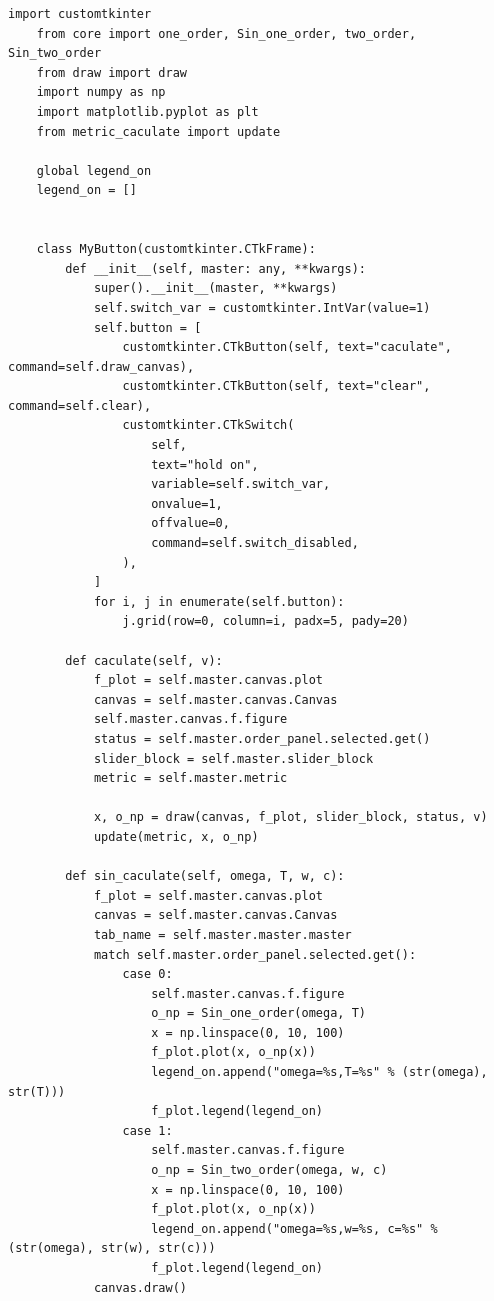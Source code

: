 \documentclass[12pt]{ctexart}
\begin{document}
\begin{lstlisting}[title=Mybutton 类代码]
    import customtkinter
    from core import one_order, Sin_one_order, two_order, Sin_two_order
    from draw import draw
    import numpy as np
    import matplotlib.pyplot as plt
    from metric_caculate import update
    
    global legend_on
    legend_on = []
    
    
    class MyButton(customtkinter.CTkFrame):
        def __init__(self, master: any, **kwargs):
            super().__init__(master, **kwargs)
            self.switch_var = customtkinter.IntVar(value=1)
            self.button = [
                customtkinter.CTkButton(self, text="caculate", command=self.draw_canvas),
                customtkinter.CTkButton(self, text="clear", command=self.clear),
                customtkinter.CTkSwitch(
                    self,
                    text="hold on",
                    variable=self.switch_var,
                    onvalue=1,
                    offvalue=0,
                    command=self.switch_disabled,
                ),
            ]
            for i, j in enumerate(self.button):
                j.grid(row=0, column=i, padx=5, pady=20)
    
        def caculate(self, v):
            f_plot = self.master.canvas.plot
            canvas = self.master.canvas.Canvas
            self.master.canvas.f.figure
            status = self.master.order_panel.selected.get()
            slider_block = self.master.slider_block
            metric = self.master.metric
    
            x, o_np = draw(canvas, f_plot, slider_block, status, v)
            update(metric, x, o_np)
    
        def sin_caculate(self, omega, T, w, c):
            f_plot = self.master.canvas.plot
            canvas = self.master.canvas.Canvas
            tab_name = self.master.master.master
            match self.master.order_panel.selected.get():
                case 0:
                    self.master.canvas.f.figure
                    o_np = Sin_one_order(omega, T)
                    x = np.linspace(0, 10, 100)
                    f_plot.plot(x, o_np(x))
                    legend_on.append("omega=%s,T=%s" % (str(omega), str(T)))
                    f_plot.legend(legend_on)
                case 1:
                    self.master.canvas.f.figure
                    o_np = Sin_two_order(omega, w, c)
                    x = np.linspace(0, 10, 100)
                    f_plot.plot(x, o_np(x))
                    legend_on.append("omega=%s,w=%s, c=%s" % (str(omega), str(w), str(c)))
                    f_plot.legend(legend_on)
            canvas.draw()
    

\end{lstlisting}
\end{document}
